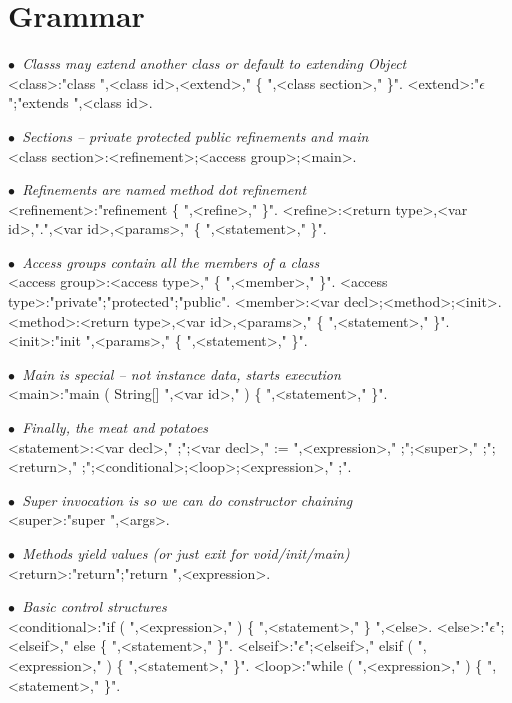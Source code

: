 \newcommand{\comment}[1]{{\escapegrammar$\bullet$\it\ #1}\\}

\section{Grammar}

\begin{grammar}

\comment{Classs may extend another class or default to extending Object}
<class>:"class ",<class id>,<extend>," \{ ",<class section>,"{\small *} \}".
<extend>:"$\epsilon$";"extends ",<class id>.

\comment{Sections -- private protected public refinements and main}
<class section>:<refinement>;<access group>;<main>.

\comment{Refinements are named method dot refinement}
<refinement>:"refinement \{ ",<refine>,"{\small *} \}".
<refine>:<return type>,<var id>,".",<var id>,<params>," \{ ",<statement>,"{\small *} \}".

\comment{Access groups contain all the members of a class}
<access group>:<access type>," \{ ",<member>,"{\small *} \}".
<access type>:"private";"protected";"public".
<member>:<var decl>;<method>;<init>.
<method>:<return type>,<var id>,<params>," \{ ",<statement>,"{\small *} \}".
<init>:"init ",<params>," \{ ",<statement>,"{\small *} \}".

\comment{Main is special -- not instance data, starts execution}
<main>:"main ( String[] ",<var id>," ) \{ ",<statement>,"{\small *} \}".

\comment{Finally, the meat and potatoes}
<statement>:<var decl>," ;";<var decl>," := ",<expression>," ;";<super>," ;";<return>," ;";<conditional>;<loop>;<expression>," ;".

\comment{Super invocation is so we can do constructor chaining}
<super>:"super ",<args>.

\comment{Methods yield values (or just exit for void/init/main)}
<return>:"return";"return ",<expression>.

\comment{Basic control structures}
<conditional>:"if ( ",<expression>," ) \{ ",<statement>,"{\small *} \} ",<else>.
<else>:"$\epsilon$";<elseif>," else \{ ",<statement>,"{\small *} \}".
<elseif>:"$\epsilon$";<elseif>," elsif ( ",<expression>," ) \{ ",<statement>,"{\small *} \}".
<loop>:"while ( ",<expression>," ) \{ ",<statement>,"{\small *} \}".


\end{grammar}
